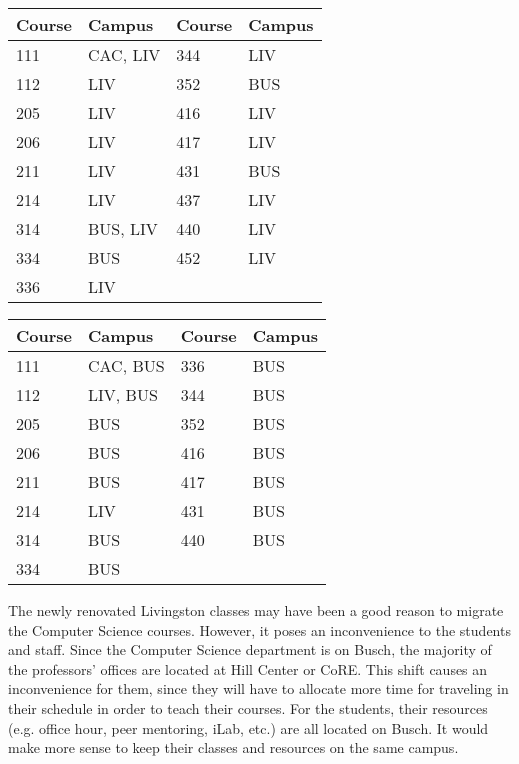 \documentclass{acm_proc_article-sp}
\begin{document}
			\begin{center}
				 \label{tab:asdf} 
				\begin{tabular}{ | l | l | l | l | }
					\hline
					Course & Campus & Course &	Campus \\ \hline
					111 & CAC, LIV & 344 & LIV \\ \hline
					112 & LIV & 352 & BUS \\ \hline
					205 & LIV & 416 & LIV \\ \hline
					206 & LIV & 417 & LIV \\ \hline
					211 & LIV & 431 & BUS \\ \hline
					214 & LIV & 437 & LIV \\ \hline
					314 & BUS, LIV & 440 & LIV \\ \hline
					334 & BUS & 452 & LIV \\ \hline
					336 & LIV & & \\ 
					\hline
				\end{tabular}
			\end{center}
			\begin{center}
				 \label{tab:title} 
				\begin{tabular} { | l | l | l | l | }
					\hline
					Course & 	Campus & Course & Campus \\ \hline
					111 & CAC, BUS & 336 & BUS \\ \hline
					112 & LIV, BUS & 344 & BUS \\ \hline
					205 & BUS & 352 & BUS \\ \hline	
					206 & BUS &	416 & BUS \\ \hline
					211 & BUS &	417 & BUS \\ \hline		
					214 & LIV &	431 & BUS \\ \hline		
					314 & BUS & 440 & BUS \\ \hline		
					334 & BUS & & \\
					\hline
				\end{tabular}
			\end{center}
			The newly renovated Livingston classes may have been a good reason to migrate
			the Computer Science courses. However, it poses an inconvenience to the
			students and staff. Since the Computer Science department is on Busch, the
			majority of the professors’ offices are located at Hill Center or CoRE. This
			shift causes an inconvenience for them, since they will have to allocate more
			time for traveling in their schedule in order to teach their courses. For the
			students, their resources (e.g. office hour, peer mentoring, iLab, etc.) are
			all located on Busch. It would make more sense to keep their classes and
			resources on the same campus. 
\end{document}
